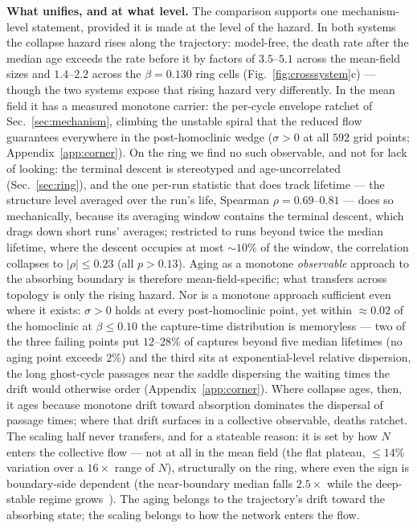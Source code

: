 \textbf{What unifies, and at what level.} The comparison supports one
mechanism-level statement, provided it is made at the level of the hazard. In
both systems the collapse hazard rises along the trajectory: model-free, the
death rate after the median age exceeds the rate before it by factors of
$3.5$--$5.1$ across the mean-field sizes and $1.4$--$2.2$ across the
$\beta = 0.130$ ring cells (Fig.~\ref{fig:crosssystem}c) --- though the two
systems expose that rising hazard very differently. In the mean field it has
a measured monotone carrier: the per-cycle envelope ratchet of
Sec.~\ref{sec:mechanism}, climbing the unstable spiral that the reduced flow
guarantees everywhere in the post-homoclinic wedge ($\sigma > 0$ at all $592$
grid points; Appendix~\ref{app:corner}). On the ring we find no such
observable, and not for lack of looking: the terminal descent is stereotyped
and age-uncorrelated (Sec.~\ref{sec:ring}), and the one per-run statistic
that does track lifetime --- the structure level averaged over the run's
life, Spearman $\rho = 0.69$--$0.81$ --- does so mechanically, because its
averaging window contains the terminal descent, which drags down short runs'
averages; restricted to runs beyond twice the median lifetime, where the
descent occupies at most ${\sim}10\%$ of the window, the correlation collapses
to $|\rho| \le 0.23$ (all $p > 0.13$). Aging as a monotone
\emph{observable} approach to the absorbing boundary is therefore
mean-field-specific; what transfers across topology is only the rising
hazard. Nor is a monotone approach sufficient even where it exists:
$\sigma > 0$ holds at every post-homoclinic point, yet within ${\approx}0.02$
of the homoclinic at $\beta \le 0.10$ the capture-time distribution is
memoryless --- two of the three failing points put $12$--$28\%$ of captures
beyond five median lifetimes (no aging point exceeds $2\%$) and the third
sits at exponential-level relative dispersion, the long ghost-cycle passages
near the saddle dispersing the waiting times the drift would otherwise order
(Appendix~\ref{app:corner}). Where collapse ages, then, it
ages because monotone drift toward absorption dominates the dispersal of
passage times; where that drift surfaces in a collective observable, deaths
ratchet. The scaling half never transfers, and for a stateable reason: it is
set by how $N$ enters the collective flow --- not at all in the mean field
(the flat plateau, ${\le}14\%$ variation over a $16\times$ range of $N$),
structurally on the ring, where even the sign is boundary-side dependent
(the near-boundary median falls $2.5\times$ while the deep-stable regime
grows~\cite{wo2011}). The aging belongs to the trajectory's drift toward the
absorbing state; the scaling belongs to how the network enters the flow.

